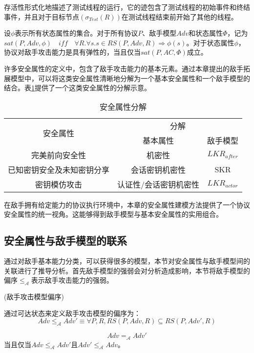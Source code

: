 	存活性形式化地描述了测试线程的运行，它的迹包含了测试线程的初始事件和终结事件，并且对于目标节点$(\sigma_{Test}(R))$在测试线程结束前开始了其他的线程。

设$\phi$表示所有状态属性的集合。对于所有协议$P$、敌手模型$Adv$和状态属性$\Phi$，记为$sat(P, Adv, \phi)\quad iff\quad \forall R. \forall s. s \in RS(P, Adv, R) \Rightarrow \phi(s)$。对于状态属性$\phi$，协议对敌手攻击能力是具有弹性的，当且仅当$sat(P,{AC}, \Phi)$成立。


许多安全属性的定义中，包含了敌手攻击能力的基本元素。通过本章提出的敌手拓展模型中，可以将这类安全属性清晰地分解为一个基本安全属性和一个敌手模型的结合。表\ref{table:chap03-propertydecomposition}提供了一个这类安全属性的分解示意。

\begin{table}[htb]
	\centering
	  \caption{安全属性分解}
\begin{tabular}{|c|c|c|}
\cline{1-3}
\multirow{2}{*}{安全属性} & \multicolumn{2}{c|}{分解}       \\\cline{2-3}
                      & 基本属性 & 敌手模型   \\\cline{1-3}
完美前向安全性               & 机密性  &  ${LKR_{after}}$     \\\cline{1-3}
已知密钥安全及未知密钥分享                     &  会话密钥机密性 &SKR \\\cline{1-3}
 密钥模仿攻击 & 认证性/会话密钥机密性  &  $LKR_{actor}$  \\\cline{1-3}
\end{tabular}
\label{table:chap03-propertydecomposition}
\end{table}

	在敌手拥有给定能力的协议执行环境中，本章的安全属性建模方法提供了一个协议安全属性的统一视角。这能够得到敌手模型与基本安全属性的实用组合。
\subsection{安全属性与敌手模型的联系}
通过对敌手基本能力分类，可以获得很多的模型，本节对安全属性与敌手模型间的关联进行了推导分析。首先敌手模型的强弱会对分析造成影响，本节将敌手模型的偏序${{\le }_{\mathcal{A}}}$表示敌手攻击能力的强弱。

	\begin{definition}{(敌手攻击模型偏序)}


	通过可达状态来定义敌手攻击模型的偏序为：
	  \[Adv{{\le }_{\mathcal{A}}}Adv'\equiv \forall P,R,RS\left( P,Adv,R \right)\subseteq RS\left( P,Adv',R \right)\]

	\[Adv{{=}_{\mathcal{A}}}Adv'\]当且仅当$Adv{{\le }_{\mathcal{A}}}Adv'$且$Adv'{{\le }_{\mathcal{A}}}Adv$。


\end{definition}

